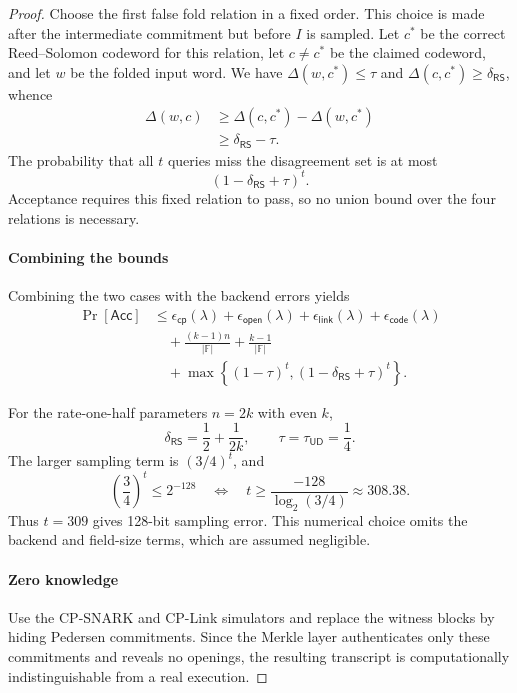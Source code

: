 \begin{revblock}
\begin{proof}
Choose the first false fold relation in a fixed order.  This choice is made
after the intermediate commitment but before \(I\) is sampled.  Let \(c^*\)
be the correct Reed--Solomon codeword for this relation, let \(c\ne c^*\) be
the claimed codeword, and let \(w\) be the folded input word.  We have
\(\Delta(w,c^*)\le\tau\) and
\(\Delta(c,c^*)\ge\delta_{\mathsf{RS}}\), whence
\[
\begin{aligned}
 \Delta(w,c)
 &\ge \Delta(c,c^*)-\Delta(w,c^*)\\
 &\ge \delta_{\mathsf{RS}}-\tau.
\end{aligned}
\]
The probability that all \(t\) queries miss the disagreement set is at most
\[
 (1-\delta_{\mathsf{RS}}+\tau)^t.
\]
Acceptance requires this fixed relation to pass, so no union bound over the
four relations is necessary.

\paragraph{Combining the bounds}
Combining the two cases with the backend errors yields
\[
\begin{aligned}
\Pr[\mathsf{Acc}]
&\le
 \epsilon_{\mathsf{cp}}(\lambda)
 +\epsilon_{\mathsf{open}}(\lambda)
 +\epsilon_{\mathsf{link}}(\lambda)
 +\epsilon_{\mathsf{code}}(\lambda)\\
&\quad
 +\frac{(k-1)n}{|\mathbb F|}
 +\frac{k-1}{|\mathbb F|}\\
&\quad
 +\max\!\left\{
   (1-\tau)^t,
   (1-\delta_{\mathsf{RS}}+\tau)^t
 \right\}.
\end{aligned}
\]

For the rate-one-half parameters \(n=2k\) with even \(k\),
\[
 \delta_{\mathsf{RS}}=\frac12+\frac{1}{2k},
 \qquad \tau=\tau_{\mathsf{UD}}=\frac14.
\]
The larger sampling term is \((3/4)^t\), and
\[
 \left(\frac34\right)^t\le2^{-128}
 \quad\Longleftrightarrow\quad
 t\ge\frac{-128}{\log_2(3/4)}\approx308.38.
\]
Thus \(t=309\) gives 128-bit sampling error.  This numerical choice omits the
backend and field-size terms, which are assumed negligible.

\paragraph{Zero knowledge}
Use the CP-SNARK and CP-Link simulators and replace the witness blocks by hiding
Pedersen commitments.  Since the Merkle layer authenticates only these
commitments and reveals no openings, the resulting transcript is
computationally indistinguishable from a real execution.
\end{proof}
\end{revblock}

